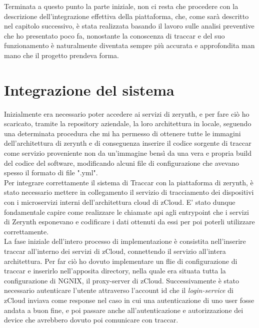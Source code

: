 \documentclass[a4paper,titlepage,12pt]{book}
\begin{document}
{Terminata a questo punto la parte iniziale, non ci resta che procedere con la descrizione dell'integrazione effettiva della piattaforma, che, come sarà descritto nel capitolo successivo, è stata realizzata basando il lavoro sulle analisi preventive che ho presentato poco fa, nonostante la conoscenza di traccar e del suo funzionamento è naturalmente diventata sempre più accurata e approfondita man mano che il progetto prendeva forma.


\chapter{
Integrazione del sistema}
Inizialmente era necessario poter accedere ai servizi di zerynth, e per fare ciò ho scaricato, tramite la repository aziendale, la loro architettura in locale, seguendo una determinata procedura che mi ha permesso di ottenere tutte le immagini dell'architettura di zerynth e di conseguenza inserire il codice sorgente di traccar come servizio proveniente non da un'immagine bensì da una vera e propria build del codice del software, modificando alcuni file di configurazione che avevano spesso il formato di file ".yml".\\
Per integrare correttamente il sistema di Traccar con la piattaforma di zerynth, è stato necessario mettere in collegamento il servizio di tracciamento dei dispositivi con i microservizi interni dell'architettura cloud di zCloud. E' stato dunque fondamentale capire come realizzare le chiamate api agli entrypoint che i servizi di Zerynth esponevano e codificare i dati ottenuti da essi per poi poterli utilizzare correttamente. \\
La fase iniziale dell'intero processo di implementazione è consistita nell'inserire traccar all'interno dei servizi di zCloud, connettendo il servizio all'intera architettura. Per far ciò ho dovuto implementare un flie di configurazione di traccar e inserirlo nell'apposita directory, nella quale era situata tutta la configurazione di NGNIX, il proxy-server di zCloud. Successivamente è stato necessario autenticare l'utente attraverso l'account id che il \textit{login-service} di zCloud inviava come response nel caso in cui una autenticazione di uno user fosse andata a buon fine, e poi passare anche all'autenticazione e autorizzazione dei device che avrebbero dovuto poi comunicare con traccar. \\
}
\end{document}

